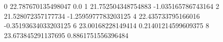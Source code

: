 0 22.787670135498047 0.0
1 21.752504348754883 -1.035165786743164
2 21.528072357177734 -1.2595977783203125
4 22.435733795166016 -0.35193634033203125
6 23.00168228149414 0.21401214599609375
8 23.673845291137695 0.8861751556396484
